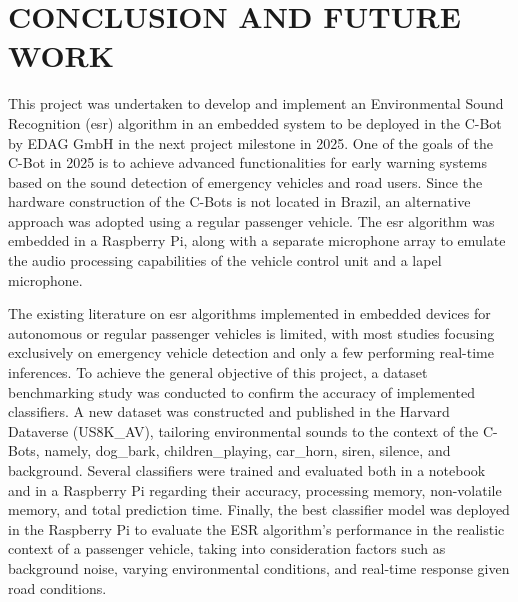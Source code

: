 \chapter{CONCLUSION AND FUTURE WORK}
\label{chp:conclusion}

This project was undertaken to develop and implement an Environmental Sound Recognition (\gls{esr}) algorithm in an embedded system to be deployed in the C-Bot by EDAG GmbH in the next project milestone in 2025. One of the goals of the C-Bot in 2025 is to achieve advanced functionalities for early warning systems based on the sound detection of emergency vehicles and road users. Since the hardware construction of the C-Bots is not located in Brazil, an alternative approach was adopted using a regular passenger vehicle. The \gls{esr} algorithm was embedded in a Raspberry Pi, along with a separate microphone array to emulate the audio processing capabilities of the vehicle control unit and a lapel microphone.

The existing literature on \gls{esr} algorithms implemented in embedded devices for autonomous or regular passenger vehicles is limited, with most studies focusing exclusively on emergency vehicle detection and only a few performing real-time inferences. To achieve the general objective of this project, a dataset benchmarking study was conducted to confirm the accuracy of implemented classifiers. A new dataset was constructed and published in the Harvard Dataverse (US8K\_AV), tailoring environmental sounds to the context of the C-Bots, namely, dog\_bark, children\_playing, car\_horn, siren, silence, and background. Several classifiers were trained and evaluated both in a notebook and in a Raspberry Pi regarding their accuracy, processing memory, non-volatile memory, and total prediction time. Finally, the best classifier model was deployed in the Raspberry Pi to evaluate the ESR algorithm's performance in the realistic context of a passenger vehicle, taking into consideration factors such as background noise, varying environmental conditions, and real-time response given road conditions.



